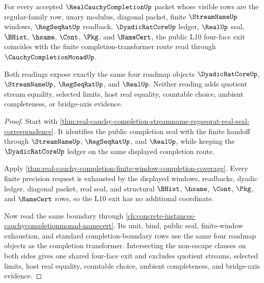 \begin{theorem}
\label{thm:real-cauchy-completion-monadic-four-face-exit-correspondence}
For every accepted $\RealCauchyCompletionUp$ packet whose visible rows are the regular-family row, unary modulus, diagonal packet, finite $\StreamNameUp$ windows, $\RegSeqRatUp$ readback, $\DyadicRatCoreUp$ ledger, $\RealUp$ seal, $\BHist$, $\hsame$, $\Cont$, $\Pkg$, and $\NameCert$, the public L10 four-face exit coincides with the finite completion-transformer route read through $\CauchyCompletionMonadUp$.

Both readings expose exactly the same four roadmap objects $\DyadicRatCoreUp$, $\StreamNameUp$, $\RegSeqRatUp$, and $\RealUp$. Neither reading adds quotient stream equality, selected limits, host real equality, countable choice, ambient completeness, or bridge-axis evidence.
\end{theorem}
\begin{proof}
Start with \autoref{thm:real-cauchy-completion-streamname-regseqrat-real-seal-correspondence}. It identifies the public completion seal with the finite handoff through $\StreamNameUp$, $\RegSeqRatUp$, and $\RealUp$, while keeping the $\DyadicRatCoreUp$ ledger on the same displayed completion route.

Apply \autoref{thm:real-cauchy-completion-finite-window-completion-coverage}. Every finite precision request is exhausted by the displayed windows, readbacks, dyadic ledger, diagonal packet, real seal, and structural $\BHist$, $\hsame$, $\Cont$, $\Pkg$, and $\NameCert$ rows, so the L10 exit has no additional coordinate.

Now read the same boundary through \autoref{ch:concrete-instances-cauchycompletionmonad-namecert}. Its unit, bind, public seal, finite-window exhaustion, and standard completion-boundary rows use the same four roadmap objects as the completion transformer. Intersecting the non-escape clauses on both sides gives one shared four-face exit and excludes quotient streams, selected limits, host real equality, countable choice, ambient completeness, and bridge-axis evidence.
\end{proof}

